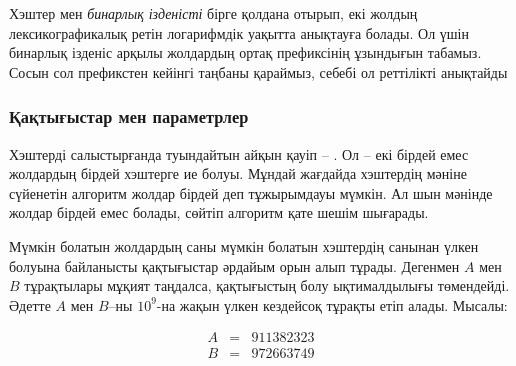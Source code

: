 Хэштер мен \emph{бинарлық ізденісті} бірге қолдана отырып,
екі жолдың лексикографикалық ретін логарифмдік уақытта
анықтауға болады. Ол үшін бинарлық ізденіс арқылы жолдардың
ортақ префиксінің ұзындығын табамыз. Сосын сол префикстен кейінгі 
таңбаны қараймыз, себебі ол реттілікті анықтайды



\subsubsection*{Қақтығыстар мен параметрлер}


Хэштерді салыстырғанда туындайтын айқын қауіп -- .
Ол -- екі бірдей емес жолдардың бірдей хэштерге ие болуы. 
Мұндай жағдайда хэштердің мәніне сүйенетін алгоритм жолдар бірдей деп
тұжырымдауы мүмкін. Ал шын мәнінде жолдар бірдей емес болады, сөйтіп алгоритм қате
шешім шығарады. 

 
Мүмкін болатын жолдардың саны мүмкін болатын
хэштердің санынан үлкен болуына байланысты қақтығыстар әрдайым орын алып тұрады. Дегенмен $A$ мен $B$ тұрақтылары
мұқият таңдалса, қақтығыстың болу ықтималдылығы төмендейді. 
Әдетте $A$ мен $B$–ны $10^9$-на жақын үлкен кездейсоқ
тұрақты етіп алады. Мысалы:

\[
\begin{array}{lcl}
A & = & 911382323 \\
B & = & 972663749 \\
\end{array}
\]

